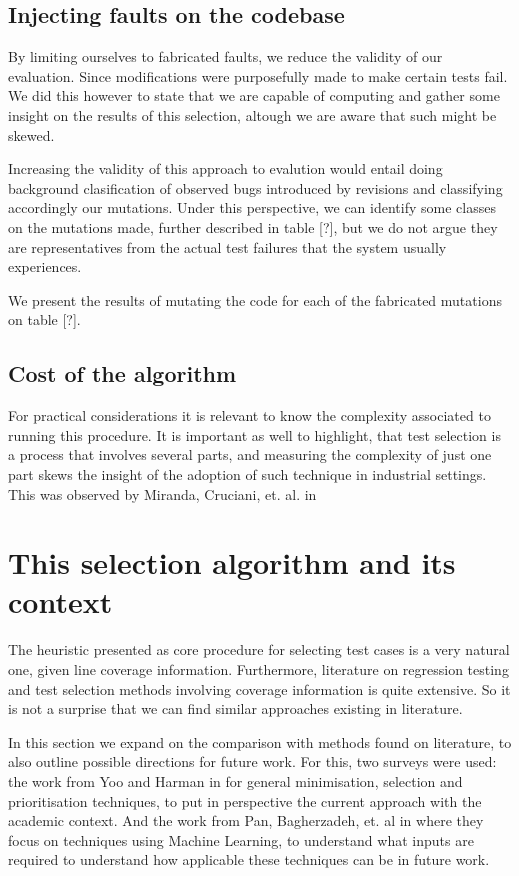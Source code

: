 \documentclass{article}
\begin{document}
\subsection{Injecting faults on the codebase}
By limiting ourselves to fabricated faults, we reduce the validity of our evaluation. Since modifications were purposefully made to make certain tests fail. We did this however to state that we are capable of computing and gather some insight on the results of this selection, altough we are aware that such might be skewed.

Increasing the validity of this approach to evalution would entail doing background clasification of observed bugs introduced by revisions and classifying accordingly our mutations. Under this perspective, we can identify some classes on the mutations made, further described in table [?], but we do not argue they are representatives from the actual test failures that the system usually experiences.

We present the results of mutating the code for each of the fabricated mutations on table [?].

\subsection{Cost of the algorithm}
For practical considerations it is relevant to know the complexity associated to running this procedure. It is important as well to highlight, that test selection is a process that involves several parts, and measuring the complexity of just one part skews the insight of the adoption of such technique in industrial settings. This was observed by Miranda, Cruciani, et. al. in \cite{TODO}
\section{This selection algorithm and its context}
The heuristic presented as core procedure for selecting test cases is a very natural one, given line coverage information. Furthermore, literature on regression testing and test selection methods involving coverage information is quite extensive. So it is not a surprise that we can find similar approaches existing in literature.

In this section we expand on the comparison with methods found on literature, to also outline possible directions for future work. For this, two surveys were used: the work from Yoo and Harman in \cite{Yoo2009RegressionTM} for general minimisation, selection and prioritisation techniques, to put in perspective the current approach with the academic context. And the work from Pan, Bagherzadeh, et. al in \cite{Pan2021TestCS} where they focus on techniques using Machine Learning, to understand what inputs are required to understand how applicable these techniques can be in future work.
\end{document}
